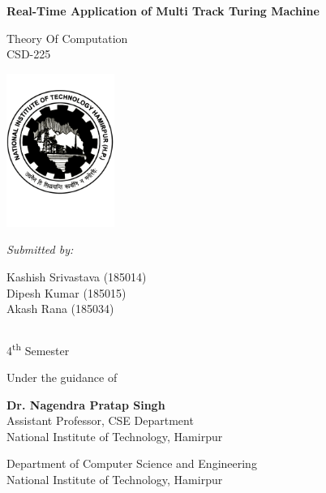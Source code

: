 \documentclass[11pt,a4paper]{report}
\begin{document}
\begin{titlepage}
    \begin{center}

        \Huge{\textbf{Real-Time Application of Multi Track Turing Machine}}
 
        \vspace{0.5cm}
        
        \normalsize
       
        \vspace{10pt}
        
        Theory Of Computation\\
        CSD-225

        
        
        \vspace{1 cm}
        \includegraphics[height=5cm]{images/nith-logo.png}
        
        \vspace{1 cm}
        \textit{Submitted by:}

            Kashish Srivastava (185014)\\
            Dipesh Kumar (185015)\\
            Akash Rana (185034)
        \vspace{5pt}
        
        \begin{tabular}{c c}
            
        \end{tabular}
 
        \vspace{5pt}
        4\textsuperscript{th} Semester
 
        \vspace{1cm}
 
        Under the guidance of
        
        \vspace{5pt}
        
        \textbf{Dr. Nagendra Pratap Singh }\\
        Assistant Professor, CSE Department\\
        National Institute of Technology, Hamirpur\\
 
        \vspace{2.35cm}
        
        \large
 
        Department of Computer Science and  Engineering\\
        National Institute of Technology, Hamirpur\\
      
    \end{center}
\end{titlepage}
\end{document}
